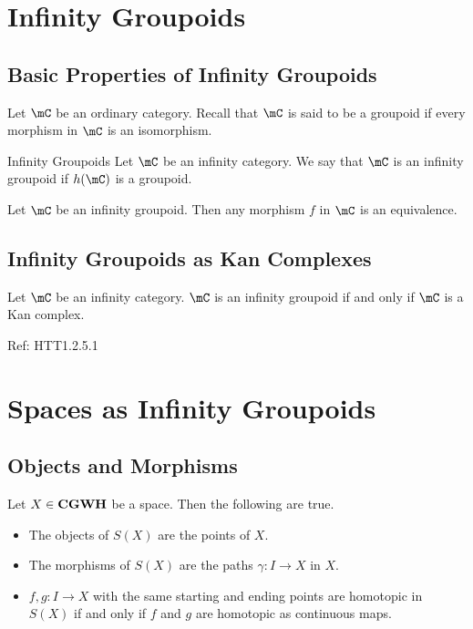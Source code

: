 \documentclass[a4paper]{article}
\begin{document}
\pagebreak
\section{Infinity Groupoids}
\subsection{Basic Properties of Infinity Groupoids}
Let $\mC$ be an ordinary category. Recall that $\mC$ is said to be a groupoid if every morphism in $\mC$ is an isomorphism. 

\begin{defn}{Infinity Groupoids}{} Let $\mC$ be an infinity category. We say that $\mC$ is an infinity groupoid if $h(\mC)$ is a groupoid. 
\end{defn}

\begin{lmm}{}{} Let $\mC$ be an infinity groupoid. Then any morphism $f$ in $\mC$ is an equivalence. 
\end{lmm}

\subsection{Infinity Groupoids as Kan Complexes}
\begin{prp}{}{} Let $\mC$ be an infinity category. $\mC$ is an infinity groupoid if and only if $\mC$ is a Kan complex. 
\end{prp}
Ref: HTT1.2.5.1


\pagebreak
\section{Spaces as Infinity Groupoids}
\subsection{Objects and Morphisms}
\begin{prp}{}{} Let $X\in\bold{CGWH}$ be a space. Then the following are true. 
\begin{itemize}
\item The objects of $S(X)$ are the points of $X$. 
\item The morphisms of $S(X)$ are the paths $\gamma:I\to X$ in $X$. 
\item $f,g:I\to X$ with the same starting and ending points are homotopic in $S(X)$ if and only if $f$ and $g$ are homotopic as continuous maps. 
\end{itemize}
\end{prp}
\end{document}

